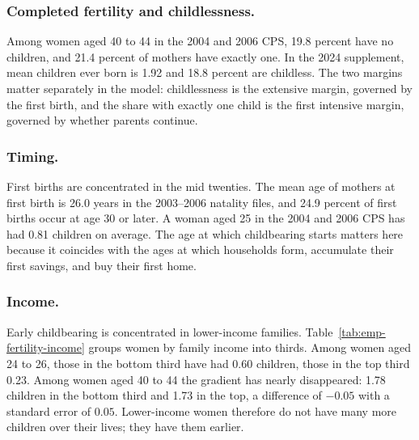 \subsubsection*{Completed fertility and childlessness.}
Among women aged 40 to 44 in the 2004 and 2006 CPS, 19.8 percent have no
children, and 21.4 percent of mothers have exactly one.
In the 2024 supplement, mean children ever born is 1.92 and 18.8 percent are
childless.
The two margins matter separately in the model: childlessness is the extensive
margin, governed by the first birth, and the share with exactly one child is
the first intensive margin, governed by whether parents continue.

\subsubsection*{Timing.}
First births are concentrated in the mid twenties. The mean age of mothers at
first birth is 26.0 years in the 2003--2006 natality files, and 24.9 percent
of first births occur at age 30 or later.
A woman aged 25 in the 2004 and 2006 CPS has had 0.81 children on average.
The age at which childbearing starts matters here because it coincides with
the ages at which households form, accumulate their first savings, and buy
their first home.

\subsubsection*{Income.}
Early childbearing is concentrated in lower-income families.
Table~\ref{tab:emp-fertility-income} groups women by family income into thirds.
Among women aged 24 to 26, those in the bottom third have had 0.60 children,
those in the top third 0.23. Among women aged 40 to 44 the gradient has
nearly disappeared: 1.78 children in the bottom third and 1.73 in the top,
a difference of $-0.05$ with a standard error of $0.05$. Lower-income women
therefore do not have many more children over their lives; they have them
earlier.

